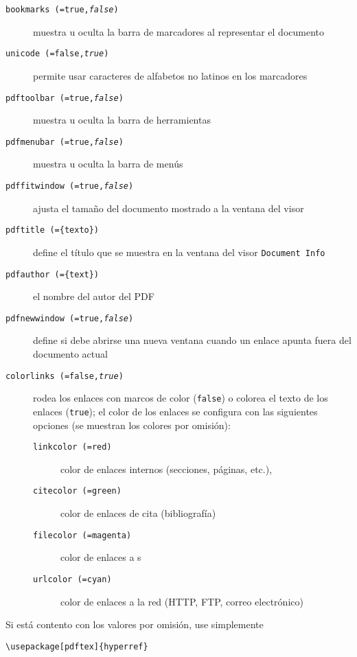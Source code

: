 \begin{flushleft}
    \begin{description}
    \item [\texttt{bookmarks (=true,\textit{false})}] muestra u oculta la barra de marcadores al representar el documento
    \item [\texttt{unicode (=false,\textit{true})}] permite usar caracteres de alfabetos no latinos en los marcadores
    \item [\texttt{pdftoolbar (=true,\textit{false})}] muestra u oculta la barra de herramientas
    \item [\texttt{pdfmenubar (=true,\textit{false})}] muestra u oculta la barra de menús
    \item [\texttt{pdffitwindow (=true,\textit{false})}] ajusta el tamaño del documento mostrado a la ventana del visor
    \item [\texttt{pdftitle (=\{texto\})}] define el título que se muestra en la ventana del visor \texttt{Document Info}
    \item [\texttt{pdfauthor (=\{text\})}] el nombre del autor del PDF
    \item [\texttt{pdfnewwindow (=true,\textit{false})}] define si debe abrirse una nueva ventana cuando un enlace apunta fuera del documento actual
    \item [\texttt{colorlinks (=false,\textit{true})}] rodea los enlaces con marcos de color (\texttt{false}) o colorea el texto de los enlaces (\texttt{true}); el color de los enlaces se configura con las siguientes opciones (se muestran los colores por omisión):
        \begin{description}
            \item [\texttt{linkcolor (=red)}] color de enlaces internos  (secciones, páginas, etc.),
            \item [\texttt{citecolor (=green)}] color de  enlaces de cita (bibliografía)
            \item [\texttt{filecolor (=magenta)}] color de enlaces a \filenomo{}s
            \item [\texttt{urlcolor (=cyan)}] color de enlaces a la red (HTTP,  FTP, correo electrónico)
        \end{description}
    \end{description}
\end{flushleft}

Si está contento con los valores por omisión, use simplemente
\begin{code}
\begin{verbatim}
\usepackage[pdftex]{hyperref}
\end{verbatim}
\end{code}

